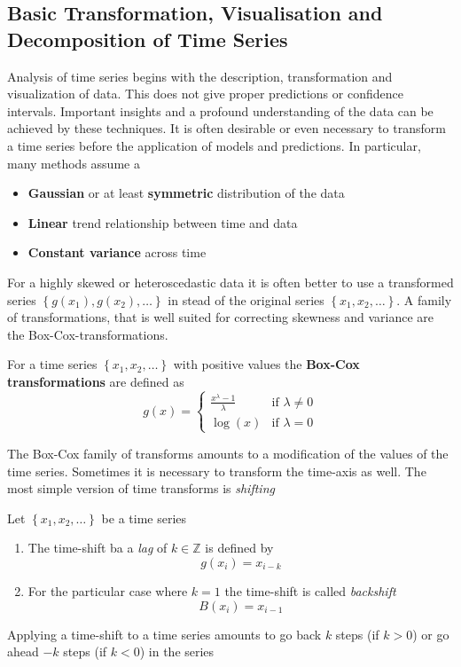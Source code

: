 \documentclass[11pt]{article}
\newcommand*\Z{\mathbb{Z}}
\begin{document}
\subsection{Basic Transformation, Visualisation and Decomposition of Time Series}
Analysis of time series begins with the description, transformation and visualization of data. This does not give proper predictions or confidence intervals. Important insights and a profound understanding of the data can be achieved by these techniques. It is often desirable or even necessary to transform a time series before the application of models and predictions. In particular, many methods assume a
\begin{itemize}[nosep]
	\item \textbf{Gaussian} or at least \textbf{symmetric} distribution of the data
	\item \textbf{Linear} trend relationship between time and data
	\item \textbf{Constant variance} across time
\end{itemize}
For a highly skewed or heteroscedastic data it is often better to use a transformed series $\left\{g(x_1), g(x_2), \dots\right\}$ in stead of the original series $\left\{x_1,x_2,\dots\right\}$. A family of transformations, that is well suited for correcting skewness and variance are the Box-Cox-transformations.
\begin{definition}
	For a time series $\left\{x_1,x_2,\dots\right\}$ with positive values the \textbf{Box-Cox transformations} are defined as
	\begin{equation*}
		g(x) = \left\{\begin{matrix}
		\frac{x^\lambda - 1}{\lambda} & \text{if } \lambda \neq 0\\
		\log(x) & \text{if } \lambda = 0
		\end{matrix}\right.
	\end{equation*}
\end{definition}
The Box-Cox family of transforms amounts to a modification of the values of the time series. Sometimes it is necessary to transform the time-axis as well. The most simple version of time transforms is \emph{shifting}
\begin{definition}
	Let $\left\{x_1,x_2,\dots\right\}$ be a time series
	\begin{enumerate}
		\item The time-shift ba a \emph{lag} of $k\in\Z$ is defined by
		\begin{equation*}
			g(x_i) = x_{i-k}
		\end{equation*}
		\item For the particular case where $k=1$ the time-shift is called \emph{backshift}
		\begin{equation*}
			B(x_i) = x_{i-1}
		\end{equation*}
	\end{enumerate}
\end{definition}
Applying a time-shift to a time series amounts to go back $k$ steps (if $k > 0$) or go ahead $-k$ steps (if $k < 0$) in the series
\end{document}
